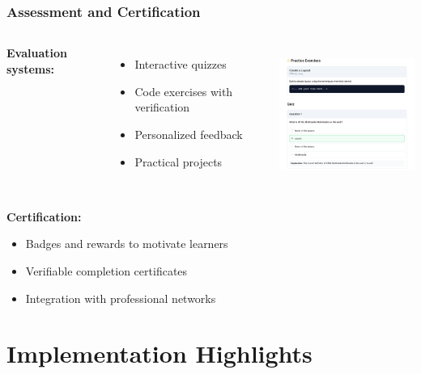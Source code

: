 \documentclass{beamer}
\begin{document}
\begin{frame}
\frametitle{Assessment and Certification}
\begin{columns}
\textbf{Evaluation systems:}
\begin{itemize}
    \item Interactive quizzes
    \item Code exercises with verification
    \item Personalized feedback
    \item Practical projects
\end{itemize}

\begin{center}
    \includegraphics[width=\textwidth,height=4.5cm,keepaspectratio]{week_3_img/part2.png}
\end{center}
\end{columns}

\vspace{0.3cm}
\textbf{Certification:}
\begin{itemize}
    \item Badges and rewards to motivate learners
    \item Verifiable completion certificates
    \item Integration with professional networks
\end{itemize}
\end{frame}

\section{Implementation Highlights}
\end{document}
